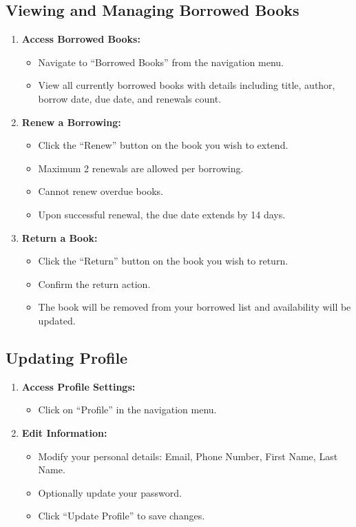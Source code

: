 \documentclass[11pt,a4paper]{article}
\begin{document}
\subsection{Viewing and Managing Borrowed Books}

\begin{enumerate}
    \item \textbf{Access Borrowed Books:}
    \begin{itemize}
        \item Navigate to ``Borrowed Books'' from the navigation menu.
        \item View all currently borrowed books with details including title, author, borrow date, due date, and renewals count.
    \end{itemize}

    \item \textbf{Renew a Borrowing:}
    \begin{itemize}
        \item Click the ``Renew'' button on the book you wish to extend.
        \item Maximum 2 renewals are allowed per borrowing.
        \item Cannot renew overdue books.
        \item Upon successful renewal, the due date extends by 14 days.
    \end{itemize}

    \item \textbf{Return a Book:}
    \begin{itemize}
        \item Click the ``Return'' button on the book you wish to return.
        \item Confirm the return action.
        \item The book will be removed from your borrowed list and availability will be updated.
    \end{itemize}
\end{enumerate}

\subsection{Updating Profile}

\begin{enumerate}
    \item \textbf{Access Profile Settings:}
    \begin{itemize}
        \item Click on ``Profile'' in the navigation menu.
    \end{itemize}

    \item \textbf{Edit Information:}
    \begin{itemize}
        \item Modify your personal details: Email, Phone Number, First Name, Last Name.
        \item Optionally update your password.
        \item Click ``Update Profile'' to save changes.
    \end{itemize}
\end{enumerate}
\end{document}
